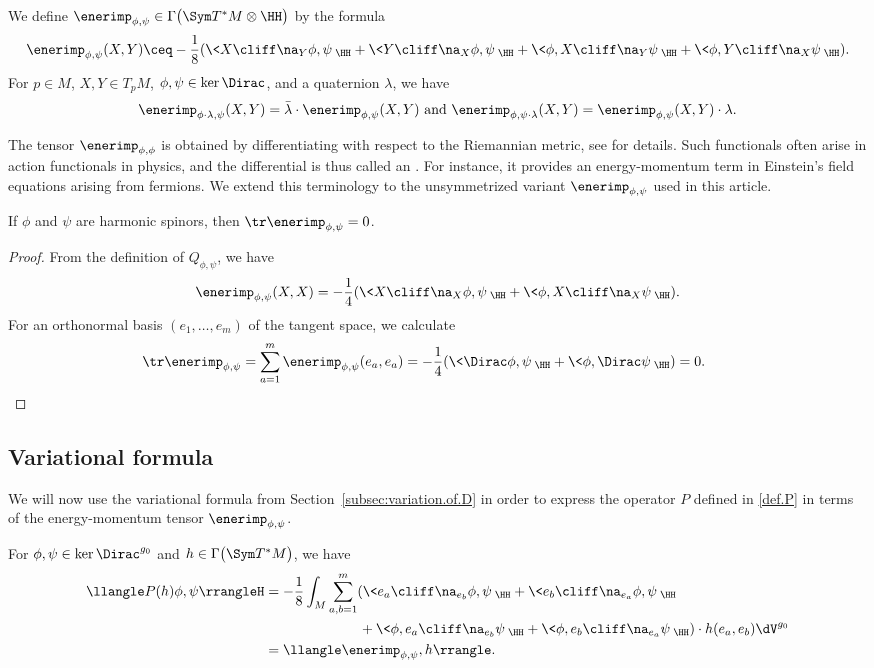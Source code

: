We define $\enerimp_{\phi,\psi}\in \Gamma\bigl(\Sym T^*M \otimes \HH\bigr)$ by the formula
\[
\enerimp_{\phi,\psi}(X,Y) \ceq
-\frac18(
\< X \cliff\na_Y \phi, \psi \>_\HH + \<Y \cliff \na_X \phi, \psi \>_\HH
+ \< \phi, X \cliff \na_Y \psi \>_\HH + \< \phi, Y \cliff\na_X \psi \>_\HH).
\]
For $p\in M$, $X,Y\in T_pM$, $\phi,\psi\in \ker\Dirac$, and a quaternion $\lambda$, we have
\[
\enerimp_{\phi\cdot \lambda,\psi}(X,Y) = \bar{\lambda}\cdot \enerimp_{\phi,\psi}(X,Y)
\text{ and }
\enerimp_{\phi,\psi\cdot \lambda}(X,Y)=\enerimp_{\phi,\psi}(X,Y)\cdot \lambda.
\]

The tensor $\enerimp_{\phi,\phi}$ is obtained by differentiating  with respect to the Riemannian metric, see \cite[Section~6]{baer.gauduchon.moroianu:05} for details.
Such functionals often arise in action functionals in physics, and the differential is thus called an .
For instance, it provides an energy-momentum term in Einstein's field equations arising from fermions.
We extend this terminology to the unsymmetrized variant $\enerimp_{\phi,\psi}$ used in this article.


\begin{Lemma}\label{lemma.em.TT}
If $\phi$ and $\psi$ are harmonic spinors, then $\tr \enerimp_{\phi,\psi}=0$.
\end{Lemma}

\begin{proof}
From the definition of $Q_{\phi,\psi}$, we have
\[
\enerimp_{\phi,\psi} (X,X)=
-\frac14 ( \< X \cliff \na_X \phi, \psi \>_\HH + \< \phi, X \cliff \na_X \psi \>_\HH ) .
\]
For an orthonormal basis $(e_1,\ldots,e_m)$ of the tangent space, we calculate
\[
\tr \enerimp_{\phi,\psi}
= \sum_{a=1}^m \enerimp_{\phi,\psi}(e_a,e_a)
= -\frac14 ( \< \Dirac\phi, \psi \>_\HH + \< \phi, \Dirac\psi \>_\HH )
= 0. \qedhere
\tag*{\qed}
\]
\renewcommand{\qed}{}
\end{proof}

\subsection{Variational formula}

We will now use the variational formula from Section~\ref{subsec:variation.of.D} in order to express the operator $P$ defined in \eqref{def.P} in terms of the energy-momentum tensor $\enerimp_{\phi,\psi}$.

\begin{Lemma}\label{lem.var.formula}
For $\phi,\psi \in \ker \Dirac^{g_0}$ and $h\in \Gamma\bigl(\Sym T^*M\bigr)$, we have
\[ \begin{split}
\llangle P(h)\phi,\psi\rrangleH
&=-\frac18 \int_M \sum_{a,b=1}^m(
\< e_a \cliff\na_{e_b} \phi, \psi \>_\HH + \< e_b \cliff\na_{e_a} \phi, \psi \>_\HH\\
&\hphantom{=-\frac18 \int_M \sum_{a,b=1}^m(}{}
+ \< \phi, e_a \cliff \na_{e_b} \psi \>_\HH + \< \phi, e_b\cliff \na_{e_a} \psi \>_\HH
)\cdot h(e_a,e_b) \dV^{g_0} \\
&= \llangle\enerimp_{\phi,\psi},h\rrangle.
\end{split}\]
\end{Lemma}

